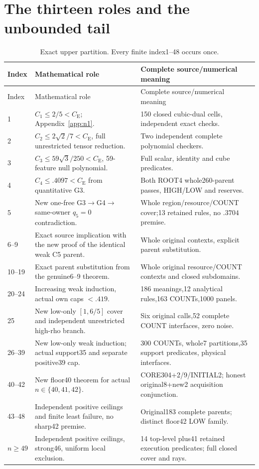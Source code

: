 \documentclass[11pt,a4paper]{article}
\newcommand{\CE}{C_{\mathrm E}}
\begin{document}
\section{The thirteen roles and the unbounded tail}
\begin{longtable}{@{}p{.10\linewidth}p{.48\linewidth}p{.34\linewidth}@{}}
\caption{Exact upper partition. Every finite index1--48 occurs once.}
\label{tab:roles}\\\toprule Index&Mathematical role&Complete source/numerical meaning\\\midrule
\endfirsthead\toprule Index&Mathematical role&Complete source/numerical meaning\\\midrule\endhead
1&$C_1\le2/5<\CE$; Appendix~\ref{app:n1}.&150 closed cubic-dual cells, independent exact checks.\\
2&$C_2\le2\sqrt2/7<\CE$, full unrestricted tensor reduction.&Two independent complete polynomial checkers.\\
3&$C_3\le59\sqrt3/250<\CE$, 59-feature null polynomial.&Full scalar, identity and cube predicates.\\
4&$C_4\le.4097<\CE$ from quantitative G3.&Both ROOT4 whole260-parent passes, HIGH/LOW and reserves.\\
5&New one-free G3$\to$G4$\to$same-owner $q_5=0$ contradiction.&Whole region/resource/COUNT cover;13 retained rules, no $.3704$ premise.\\
6--9&Exact source implication with the new proof of the identical weak C5 parent.&Whole original contexts, explicit parent substitution.\\
10--19&Exact parent substitution from the genuine6--9 theorem.&Whole original resource/COUNT contexts and closed subdomains.\\
20--24&Increasing weak induction, actual own caps $<.419$.&186 meanings,12 analytical rules,163 COUNTs,1000 panels.\\
25&New low-only $[1,6/5]$ cover and independent unrestricted high-rho branch.&Six original calls,52 complete COUNT interfaces, zero noise.\\
26--39&New low-only weak induction; actual support35 and separate positive39 cap.&300 COUNTs, whole7 partitions,35 support predicates, physical interfaces.\\
40--42&New floor40 theorem for actual $n\in\{40,41,42\}$.&CORE304+2/9/INITIAL2; honest original8+new2 acquisition conjunction.\\
43--48&Independent positive ceilings and finite least failure, no sharp42 premise.&Original183 complete parents; distinct floor42 LOW family.\\
$n\ge49$&Independent positive ceilings, strong46, uniform local exclusion.&14 top-level plus41 retained execution predicates; full closed cover and rays.\\\bottomrule
\end{longtable}
\end{document}
